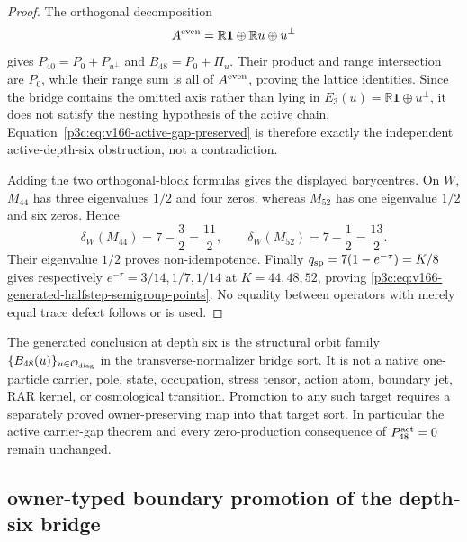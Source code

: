 \documentclass[12pt,a4paper]{article}
\begin{document}
\begin{proof}
The orthogonal decomposition
\[
 A^{\rm even}
 =\mathbb R\mathbf1\oplus\mathbb Ru\oplus u^\perp
\]
gives
\(P_{40}=P_0+P_{u^\perp}\) and
\(B_{48}=P_0+\Pi_u\).  Their product and range intersection are \(P_0\),
while their range sum is all of \(A^{\rm even}\), proving the lattice
identities.  Since the bridge contains the omitted axis rather than lying in
\(E_3(u)=\mathbb R\mathbf1\oplus u^\perp\), it does not satisfy the nesting
hypothesis of the active chain.  Equation~\eqref{p3c:eq:v166-active-gap-preserved}
is therefore exactly the independent active-depth-six obstruction, not a
contradiction.

Adding the two orthogonal-block formulas gives the displayed barycentres.
On \(W\), \(M_{44}\) has three eigenvalues \(1/2\) and four zeros, whereas
\(M_{52}\) has one eigenvalue \(1/2\) and six zeros.  Hence
\[
 \delta_W(M_{44})=7-\frac32=\frac{11}{2},
 \qquad
 \delta_W(M_{52})=7-\frac12=\frac{13}{2}.
\]
Their eigenvalue \(1/2\) proves non-idempotence.  Finally
\(q_{\rm sp}=7(1-e^{-\tau})=K/8\) gives respectively
\(e^{-\tau}=3/14,1/7,1/14\) at \(K=44,48,52\), proving
\eqref{p3c:eq:v166-generated-halfstep-semigroup-points}.  No equality between
operators with merely equal trace defect follows or is used.
\end{proof}

\begin{corollary}
\label{p3c:cor:v166-transverse-bridge-scope}
The generated conclusion at depth six is the structural orbit family
\(\{B_{48}(u)\}_{u\in\mathcal O_{\rm diag}}\) in the transverse-normalizer
bridge sort.  It is not a native one-particle carrier, pole, state,
occupation, stress tensor, action atom, boundary jet, RAR kernel, or
cosmological transition.  Promotion to any such target requires a separately
proved owner-preserving map into that target sort.  In particular the active
carrier-gap theorem and every zero-production consequence of
\(P_{48}^{\rm act}=0\) remain unchanged.
\end{corollary}


\subsection{owner-typed boundary promotion of the depth-six bridge}
\label{p3c:sec:v158-b48-boundary-promotion}
\end{document}
